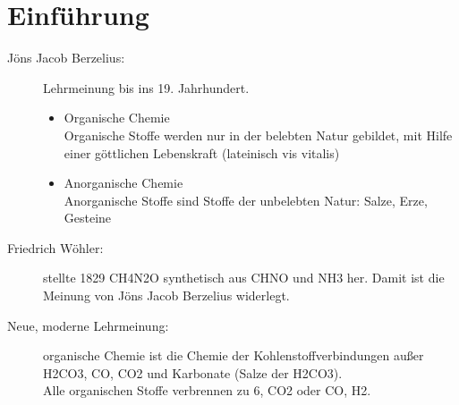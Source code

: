 \section{Einführung}

\begin{description}
	\item[Jöns Jacob Berzelius:] Lehrmeinung bis ins 19. Jahrhundert.
	\begin{itemize}
		\item Organische Chemie \\
			Organische Stoffe werden nur in der belebten Natur gebildet,
			mit Hilfe einer göttlichen Lebenskraft (lateinisch vis vitalis)
		\item Anorganische Chemie \\
			Anorganische Stoffe sind Stoffe der unbelebten Natur: Salze, Erze, Gesteine
	\end{itemize}
	\item[Friedrich Wöhler:] stellte 1829 \ac{CH4N2O} synthetisch aus \ac{CHNO} und \ac{NH3} her.
		Damit ist die Meinung von Jöns Jacob Berzelius widerlegt.
		\begin{center}
		\end{center}
	\item[Neue, moderne Lehrmeinung:] organische Chemie ist die Chemie der Kohlenstoffverbindungen
		außer \ac{H2CO3}, \ac{CO}, \ac{CO2} und Karbonate (Salze der \ac{H2CO3}). \\
		Alle organischen Stoffe verbrennen zu \ac{6}, \ac{CO2} oder \ac{CO}, \ac{H2}.
\end{description}

